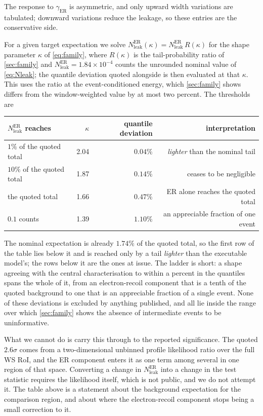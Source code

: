 \documentclass[11pt,a4paper]{article}
\begin{document}
\noindent The response to \(\gamma_\mathrm{ER}\) is asymmetric, and only
upward width variations are tabulated; downward variations reduce the
leakage, so these entries are the conservative side.

For a given target expectation we
solve \(N^{\mathrm{ER}}_{\mathrm{leak}}(\kappa)=N^{\mathrm{ER}}_{\mathrm{leak}}\,
R(\kappa)\) for the shape parameter \(\kappa\) of \cref{eq:family}, where
\(R(\kappa)\) is the tail-probability ratio of \cref{sec:family} and
\(N^{\mathrm{ER}}_{\mathrm{leak}}=1.84\times10^{-4}\) counts the unrounded nominal
value of \cref{eq:Nleak}; the quantile deviation quoted alongside is then
evaluated at that \(\kappa\). This uses the ratio at the event-conditioned
energy, which \cref{sec:family} shows differs from the
window-weighted value by at most two percent. The thresholds are

\begin{center}
\begin{tabular}{lrrr}
\toprule
\(N^{\mathrm{ER}}_{\mathrm{leak}}\) reaches & \(\kappa\) & quantile deviation & interpretation\\
\midrule
\(1\%\) of the quoted total   & 2.04 & \(0.04\%\) & \emph{lighter} than the nominal tail\\
\(10\%\) of the quoted total  & 1.87 & \(0.14\%\) & ceases to be negligible\\
the quoted total              & 1.66 & \(0.47\%\) & ER alone reaches the quoted total\\
\(0.1\) counts                & 1.39 & \(1.10\%\) & an appreciable fraction of one event\\
\bottomrule
\end{tabular}
\end{center}

\noindent The nominal expectation is already \(1.74\%\) of the quoted
total, so the first row of the table lies below it and is reached only by
a tail \emph{lighter} than the executable model's; the rows below it are
the ones at issue. The ladder is short: a shape agreeing with the central
characterisation to within a percent in the quantiles spans the whole of
it, from an electron-recoil component that is a tenth of the quoted
background to one that is an appreciable fraction of a single event. None
of these deviations is excluded by anything published, and all lie inside
the range over which \cref{sec:family} shows the absence of intermediate
events to be uninformative.

What we cannot do is carry this through to the reported significance.
The quoted \(2.6\sigma\) comes from a two-dimensional unbinned profile
likelihood ratio over the full WS RoI, and the ER component enters it as
one term among several in one region of that space. Converting a change
in \(N^{\mathrm{ER}}_{\mathrm{leak}}\) into a change in the test
statistic requires the likelihood itself, which is not public, and we do
not attempt it. The table above is a statement about the background
expectation for the comparison region, and about where the electron-recoil
component stops being a small correction to it.
\end{document}
